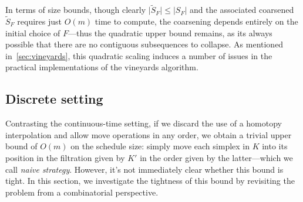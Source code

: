 \documentclass[sn-mathphys]{sn-jnl}
\begin{document}
\noindent 
In terms of size bounds, though clearly $\lvert \widetilde{S}_F \rvert \leq \lvert S_F \rvert$ and the associated coarsened $\widetilde{S}_F$ requires just $O(m)$ time to compute, the coarsening depends entirely on the initial choice of $F$---thus the quadratic upper bound remains, as its always possible that there are no contiguous subsequences to collapse. 
As mentioned in~\ref{sec:vineyards}, this quadratic scaling induces a number of issues in the practical implementations of the vineyards algorithm.



\subsection{Discrete setting}\label{sec:moves_setting}


Contrasting the continuous-time setting, if we discard the use of a homotopy interpolation and allow move operations in any order, we obtain a trivial upper bound of $O(m)$ on the schedule size:  simply move each simplex in $K$ into its position in the filtration given by $K'$ in the order given by the latter---which we call \emph{naive strategy}. However, it's not immediately clear whether this bound is tight. In this section, we investigate the tightness of this bound by revisiting the problem from a combinatorial perspective. 
\end{document}
